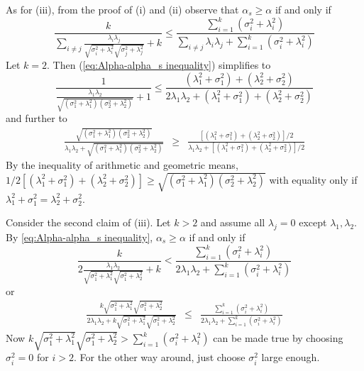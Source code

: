 \documentclass{article}
\makeatletter
\theoremstyle{plain}
\theoremstyle{plain}
\theoremstyle{definition}
\theoremstyle{remark}
\theoremstyle{definition}
\theoremstyle{plain}
\theoremstyle{plain}
\theoremstyle{definition}
\newenvironment{proof}[1][\protect\proofname]{\par
	\normalfont\topsep6\p@\@plus6\p@\relax
	\trivlist
	\itemindent\parindent
	\item[\hskip\labelsep\scshape #1]\ignorespaces
}{%
	\endtrivlist\@endpefalse
}
\providecommand{\proofname}{Proof}
\makeatother
\begin{document}
\begin{proof}[Proof of Proposition \ref{prop:Reliabilities.}]
As for (iii), from the proof of (i) and (ii) observe that $\alpha_{s}\geq\alpha$
if and only if
\begin{equation}
\label{eq:Alpha-alpha_s inequality}
\frac{k}{\sum_{i\neq j}\frac{\lambda_{i}\lambda_{j}}{\sqrt{\sigma_{i}^{2}+\lambda_{i}^{2}}\sqrt{\sigma_{j}^{2}+\lambda_{j}^{2}}}+k}\leq\frac{\sum_{i=1}^{k}\left(\sigma_{i}^{2}+\lambda_{i}^{2}\right)}{\sum_{i\neq j}\lambda_{i}\lambda_{j}+\sum_{i=1}^{k}\left(\sigma_{i}^{2}+\lambda_{i}^{2}\right)}
\end{equation}
Let $k=2$. Then (\ref{eq:Alpha-alpha_s inequality}) simplifies to
\[
\frac{1}{\frac{\lambda_{1}\lambda_{2}}{\sqrt{\left(\sigma_{1}^{2}+\lambda_{1}^{2}\right)\left(\sigma_{2}^{2}+\lambda_{2}^{2}\right)}}+1}\leq\frac{\left(\lambda_{1}^{2}+\sigma_{1}^{2}\right)+\left(\lambda_{2}^{2}+\sigma_{2}^{2}\right)}{2\lambda_{1}\lambda_{2}+\left(\lambda_{1}^{2}+\sigma_{1}^{2}\right)+\left(\lambda_{2}^{2}+\sigma_{2}^{2}\right)}
\]
and further to
\begin{eqnarray*}
\frac{\sqrt{\left(\sigma_{1}^{2}+\lambda_{1}^{2}\right)\left(\sigma_{2}^{2}+\lambda_{2}^{2}\right)}}{\lambda_{1}\lambda_{2}+\sqrt{\left(\sigma_{1}^{2}+\lambda_{1}^{2}\right)\left(\sigma_{2}^{2}+\lambda_{2}^{2}\right)}} & \geq & \frac{\left[\left(\lambda_{1}^{2}+\sigma_{1}^{2}\right)+\left(\lambda_{2}^{2}+\sigma_{2}^{2}\right)\right]/2}{\lambda_{1}\lambda_{2}+\left[\left(\lambda_{1}^{2}+\sigma_{1}^{2}\right)+\left(\lambda_{2}^{2}+\sigma_{2}^{2}\right)\right]/2}
\end{eqnarray*}
By the inequality of arithmetic and geometric means, $1/2\left[\left(\lambda_{1}^{2}+\sigma_{1}^{2}\right)+\left(\lambda_{2}^{2}+\sigma_{2}^{2}\right)\right]\geq\sqrt{\left(\sigma_{1}^{2}+\lambda_{1}^{2}\right)\left(\sigma_{2}^{2}+\lambda_{2}^{2}\right)}$
with equality only if $\lambda_{1}^{2}+\sigma_{1}^{2}=\lambda_{2}^{2}+\sigma_{2}^{2}$.

Consider the second claim of (iii). Let $k>2$ and assume all $\lambda_{j}=0$
except $\lambda_{1},\lambda_{2}$. By \eqref{eq:Alpha-alpha_s inequality}, $\alpha_s \geq \alpha$ if and
only if
\[
\frac{k}{2\frac{\lambda_{1}\lambda_{2}}{\sqrt{\sigma_{1}^{2}+\lambda_{1}^{2}}\sqrt{\sigma_{1}^{2}+\lambda_{2}^{2}}}+k}<\frac{\sum_{i=1}^{k}\left(\sigma_{i}^{2}+\lambda_{i}^{2}\right)}{2\lambda_{1}\lambda_{2}+\sum_{i=1}^{k}\left(\sigma_{i}^{2}+\lambda_{i}^{2}\right)}
\]
or
\begin{eqnarray*}
\frac{k\sqrt{\sigma_{1}^{2}+\lambda_{1}^{2}}\sqrt{\sigma_{1}^{2}+\lambda_{2}^{2}}}{2\lambda_{1}\lambda_{2}+k\sqrt{\sigma_{1}^{2}+\lambda_{1}^{2}}\sqrt{\sigma_{1}^{2}+\lambda_{2}^{2}}} & \leq & \frac{\sum_{i=1}^{k}\left(\sigma_{i}^{2}+\lambda_{i}^{2}\right)}{2\lambda_{1}\lambda_{2}+\sum_{i=1}^{k}\left(\sigma_{i}^{2}+\lambda_{i}^{2}\right)}
\end{eqnarray*}
Now $k\sqrt{\sigma_{1}^{2}+\lambda_{1}^{2}}\sqrt{\sigma_{1}^{2}+\lambda_{2}^{2}}>\sum_{i=1}^{k}\left(\sigma_{i}^{2}+\lambda_{i}^{2}\right)$
can be made true by choosing $\sigma_{i}^{2}=0$ for $i>2$. For the
other way around, just choose $\sigma_{i}^{2}$ large enough.
\end{proof}
\end{document}
